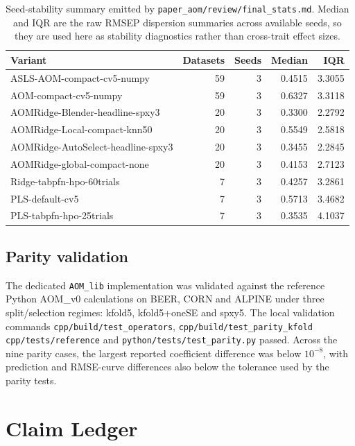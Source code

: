\documentclass[11pt,a4paper]{article}
\newcommand{\code}[1]{\nolinkurl{#1}}
\begin{document}
\begin{table}[h]
\centering
\caption{Seed-stability summary emitted by
\code{paper_aom/review/final_stats.md}.  Median and IQR are the raw RMSEP
dispersion summaries across available seeds, so they are used here as
stability diagnostics rather than cross-trait effect sizes.}
\small
\begin{tabularx}{\linewidth}{Xrrrr}
\toprule
Variant & Datasets & Seeds & Median & IQR \\
\midrule
ASLS-AOM-compact-cv5-numpy & 59 & 3 & 0.4515 & 3.3055\\
AOM-compact-cv5-numpy & 59 & 3 & 0.6327 & 3.3118\\
AOMRidge-Blender-headline-spxy3 & 20 & 3 & 0.3300 & 2.2792\\
AOMRidge-Local-compact-knn50 & 20 & 3 & 0.5549 & 2.5818\\
AOMRidge-AutoSelect-headline-spxy3 & 20 & 3 & 0.3455 & 2.2845\\
AOMRidge-global-compact-none & 20 & 3 & 0.4153 & 2.7123\\
Ridge-tabpfn-hpo-60trials & 7 & 3 & 0.4257 & 3.2861\\
PLS-default-cv5 & 7 & 3 & 0.5713 & 3.4682\\
PLS-tabpfn-hpo-25trials & 7 & 3 & 0.3535 & 4.1037\\
\bottomrule
\end{tabularx}
\end{table}

\subsection{Parity validation}

The dedicated \code{AOM_lib} implementation was validated against the
reference Python AOM\_v0 calculations on BEER, CORN and ALPINE under three
split/selection regimes: kfold5, kfold5+oneSE and spxy5.  The local validation
commands \code{cpp/build/test_operators},
\code{cpp/build/test_parity_kfold cpp/tests/reference} and
\code{python/tests/test_parity.py} passed.  Across the nine parity cases, the
largest reported coefficient difference was below $10^{-8}$, with prediction
and RMSE-curve differences also below the tolerance used by the parity tests.

\section{Claim Ledger}
\end{document}
